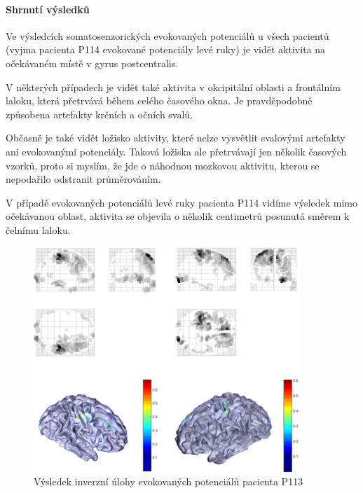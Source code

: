 \paragraph{Shrnutí výsledků}
Ve výsledcích somatosenzorických evokovaných potenciálů u všech pacientů (vyjma pacienta P114 evokované potenciály levé ruky) je vidět aktivita na očekávaném místě v gyrus postcentralis.

V některých případech je vidět také aktivita v okcipitální oblasti a frontálním laloku, která přetrvává během celého časového okna. Je pravděpodobně způsobena artefakty krčních a očních svalů.

Občasně je také vidět ložisko aktivity, které nelze vysvětlit svalovými artefakty ani evokovanými potenciály. Taková ložiska ale přetrvávají jen několik časových vzorků, proto si myslím, že jde o náhodnou mozkovou aktivitu, kterou se nepodařilo odstranit průměrováním.

V případě evokovaných potenciálů levé ruky pacienta P114 vidíme výsledek mimo očekávanou oblast, aktivita se objevila o několik centimetrů posunutá směrem k čelnímu laloku. 



\begin{figure}[!p]
\includegraphics[width=0.9\textwidth]{casti/aplikace/sep/P113.png}
\caption{Výsledek inverzní úlohy evokovaných potenciálů pacienta P113}
\label{sepP113}
\end{figure}


